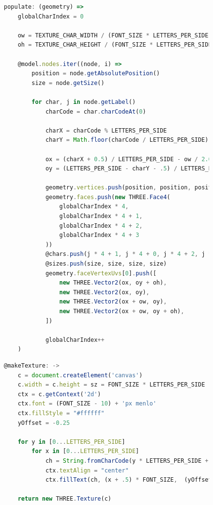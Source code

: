 \begin{figure}
\begin{lstlisting}[caption={Initial creation of the labels in-memory representation.},label=lst:labels-cpu,language=javascript]
populate: (geometry) =>
    globalCharIndex = 0

    ow = TEXTURE_CHAR_WIDTH / (FONT_SIZE * LETTERS_PER_SIDE)
    oh = TEXTURE_CHAR_HEIGHT / (FONT_SIZE * LETTERS_PER_SIDE)

    @model.nodes.iter((node, i) =>
        position = node.getAbsolutePosition()
        size = node.getSize()

        for char, j in node.getLabel()
            charCode = char.charCodeAt(0)

            charX = charCode % LETTERS_PER_SIDE
            charY = Math.floor(charCode / LETTERS_PER_SIDE)

            ox = (charX + 0.5) / LETTERS_PER_SIDE - ow / 2.0
            oy = (LETTERS_PER_SIDE - charY - .5) / LETTERS_PER_SIDE - oh / 2.0

            geometry.vertices.push(position, position, position, position)
            geometry.faces.push(new THREE.Face4(
                globalCharIndex * 4,
                globalCharIndex * 4 + 1,
                globalCharIndex * 4 + 2,
                globalCharIndex * 4 + 3
            ))
            @chars.push(j * 4 + 1, j * 4 + 0, j * 4 + 2, j * 4 + 3)
            @sizes.push(size, size, size, size)
            geometry.faceVertexUvs[0].push([
                new THREE.Vector2(ox, oy + oh),
                new THREE.Vector2(ox, oy),
                new THREE.Vector2(ox + ow, oy),
                new THREE.Vector2(ox + ow, oy + oh),
            ])

            globalCharIndex++
    )
\end{lstlisting}
\end{figure}

\begin{figure}
\begin{lstlisting}[caption={Dynamic creation of the texture.},label=lst:labels-texture,language=javascript]
@makeTexture: ->
    c = document.createElement('canvas')
    c.width = c.height = sz = FONT_SIZE * LETTERS_PER_SIDE
    ctx = c.getContext('2d')
    ctx.font = (FONT_SIZE - 10) + 'px menlo'
    ctx.fillStyle = "#ffffff"
    yOffset = -0.25

    for y in [0...LETTERS_PER_SIDE]
        for x in [0...LETTERS_PER_SIDE]
            ch = String.fromCharCode(y * LETTERS_PER_SIDE + x)
            ctx.textAlign = "center"
            ctx.fillText(ch, (x + .5) * FONT_SIZE,  (yOffset + y + 1) * FONT_SIZE)

    return new THREE.Texture(c)
\end{lstlisting}
\end{figure}

